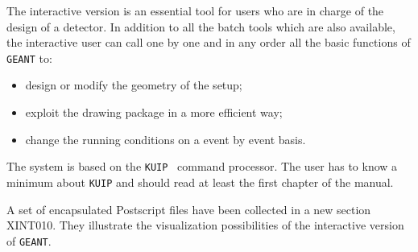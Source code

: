    
    
 
The interactive version is an essential tool for users who are
in charge of the design of a detector.
In addition to all the batch tools which are also available, the
interactive user can call one by one and in any order all the basic
functions of {\tt GEANT} to:
\begin{itemize}
\item design or modify the geometry of the setup;
\item exploit the drawing package in a more efficient way;
\item change the running conditions on a event by event basis.
\end{itemize}
The system is based on the {\tt KUIP}~\cite{bib-KUIP}
command processor.
The user has to know a minimum about {\tt KUIP} and should read
at least the first chapter of the manual.

A set of encapsulated Postscript files have been collected in
a new section XINT010. They illustrate the visualization possibilities
of the interactive version of {\tt GEANT}. 

